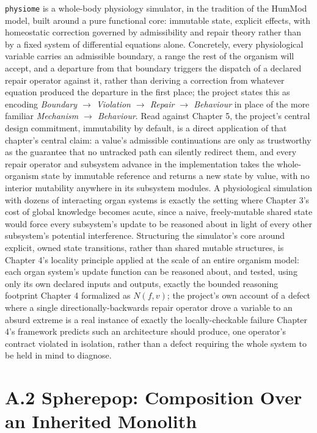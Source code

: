 \documentclass[11pt]{book}
\begin{document}
\texttt{physiome} is a whole-body physiology simulator, in the tradition of the HumMod model, built around a pure functional core: immutable state, explicit effects, with homeostatic correction governed by admissibility and repair theory rather than by a fixed system of differential equations alone. Concretely, every physiological variable carries an admissible boundary, a range the rest of the organism will accept, and a departure from that boundary triggers the dispatch of a declared repair operator against it, rather than deriving a correction from whatever equation produced the departure in the first place; the project states this as encoding \emph{Boundary $\rightarrow$ Violation $\rightarrow$ Repair $\rightarrow$ Behaviour} in place of the more familiar \emph{Mechanism $\rightarrow$ Behaviour}. Read against Chapter 5, the project's central design commitment, immutability by default, is a direct application of that chapter's central claim: a value's admissible continuations are only as trustworthy as the guarantee that no untracked path can silently redirect them, and every repair operator and subsystem advance in the implementation takes the whole-organism state by immutable reference and returns a new state by value, with no interior mutability anywhere in its subsystem modules. A physiological simulation with dozens of interacting organ systems is exactly the setting where Chapter 3's cost of global knowledge becomes acute, since a naive, freely-mutable shared state would force every subsystem's update to be reasoned about in light of every other subsystem's potential interference. Structuring the simulator's core around explicit, owned state transitions, rather than shared mutable structures, is Chapter 4's locality principle applied at the scale of an entire organism model: each organ system's update function can be reasoned about, and tested, using only its own declared inputs and outputs, exactly the bounded reasoning footprint Chapter 4 formalized as $N(f, v)$; the project's own account of a defect where a single directionally-backwards repair operator drove a variable to an absurd extreme is a real instance of exactly the locally-checkable failure Chapter 4's framework predicts such an architecture should produce, one operator's contract violated in isolation, rather than a defect requiring the whole system to be held in mind to diagnose.

\section*{A.2 Spherepop: Composition Over an Inherited Monolith}
\end{document}
